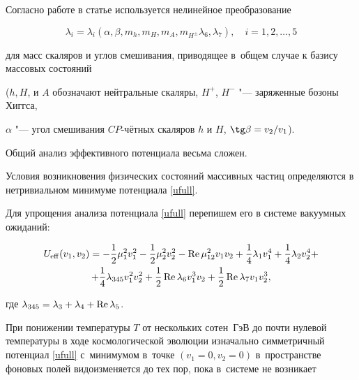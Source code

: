 Согласно работе \cite{141516} в статье используется нелинейное преобразование

\begin{equation}

\lambda_i=\lambda_i(\alpha, \beta, m_h, m_H, m_A, m_{H^\pm} \lambda_6, \lambda_7),\quad i=1, 2, \dots, 5

\end{equation}

для масс скаляров и углов смешивания, приводящее в~общем случае к базису массовых состояний 

($h, H$, и $A$ обозначают нейтральные скаляры, $H^+$, $H^-$ "--- заряженные бозоны Хиггса, 

$\alpha$ "--- угол смешивания $CP$-чётных скаляров $h$ и $H$, $\tg \beta=v_2/v_1$).





Общий анализ эффективного потенциала  весьма сложен.  

Условия возникновения физических состояний массивных частиц определяются в нетривиальном минимуме потенциала \eqref{ufull}. 

Для упрощения анализа потенциала \eqref{ufull} перепишем его в системе вакуумных ожиданий:

\begin{multline}

U_{\rm eff} (v_{1} ,v_{2} )=-\frac{1}{2} \mu _{1}^{2} v_{1}^{2} -\frac{1}{2} \mu _{2}^{2} v_{2}^{2} -\mathop{\rm Re}\mu ^{2} _{12} v_{1} v_{2} +\frac{1}{4} \lambda _{1} v_{1}^{4} +\frac{1}{4} \lambda _{2} v_{2}^{4} +

\\

\label{uvac} +\frac{1}{4} \lambda _{345} v_{1}^{2} v_{2}^{2} +\frac{1}{2}\mathop{\rm Re}\lambda _{6} v_{1}^{3} v_{2} +\frac{1}{2}\mathop{\rm Re}\lambda _{7} v_{1} v_{2}^{3} ,

\end{multline}

где $\lambda _{345} =\lambda _{3} +\lambda _{4} +\mathop{\rm Re}\lambda _{5} $.



При понижении температуры $T$ от  нескольких сотен~ГэВ до почти нулевой температуры в ходе космологической эволюции изначально симметричный потенциал \eqref{ufull} с~минимумом в~точке $(v_1=0, v_2=0)$ в~пространстве фоновых полей видоизменяется до тех пор, пока в~системе не возникает


